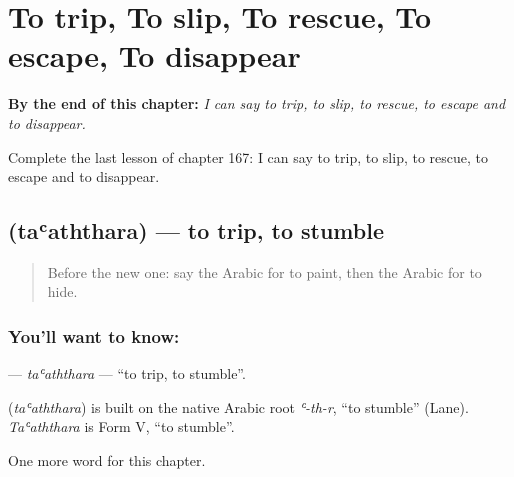 
\chapter{To trip, To slip, To rescue, To escape, To disappear}
\label{ch:ar-to-trip-to-slip-to-rescue-to-escape-to-disappear}

\begin{chapteropening}
\textbf{By the end of this chapter:} \emph{I can say to trip, to slip, to rescue, to escape and to disappear.}

Complete the last lesson of chapter 167: I can say to trip, to slip, to rescue, to escape and to disappear.
\end{chapteropening}

\section[\texorpdfstring{\ar{تعثر} (taʿaththara)}{تعثر (taʿaththara)}]{ (taʿaththara) — to trip, to stumble}

\label{lesson:AR-C167-taaththara}



\begin{quote}
Before the new one: say the Arabic for to paint, then the Arabic for to hide.
\end{quote}

\subsection*{You'll want to know: }
\textbf{} — \emph{taʿaththara} — \textquotedblleft{}to trip, to stumble\textquotedblright{}.

\begin{cousinweb}
\textbf{} (\emph{taʿaththara}) is built on the native Arabic root \emph{ʿ-th-r}, \textquotedblleft{}to stumble\textquotedblright{} (Lane). \emph{Taʿaththara} is Form V, \textquotedblleft{}to stumble\textquotedblright{}.
\end{cousinweb}

\begin{grammarlens}[title={What you've built}]
One more word for this chapter.
\end{grammarlens}

